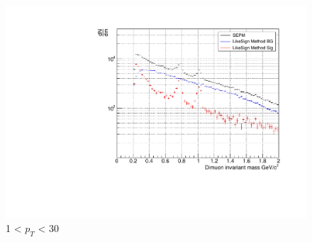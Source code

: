                 \begin{figure}[H]
                    \centering
                    \includegraphics[keepaspectratio, scale=0.5]{fig/3_4_1_CB_pt_1to30.pdf}
                    \caption{1 < $p_{T}$ < 30}
                    \label{All_pt_CB}
                \end{figure}

